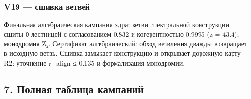 \documentclass[11pt,a4paper]{article}
\begin{document}
\subsubsection{V19 — сшивка ветвей}

Финальная алгебраическая кампания ядра: ветви спектральной конструкции сшиты θ-лестницей с согласованием 0.832 и когерентностью 0.9995 (z = 43.4); монодромия Z₂. Сертификат алгебраический: обход ветвления дважды возвращает в исходную ветвь. Сшивка замыкает конструкцию и открывает дорожную карту R2: уточнение r\_align ≤ 0.135 и формализация монодромии.

\subsection{7. Полная таблица кампаний}
\end{document}
